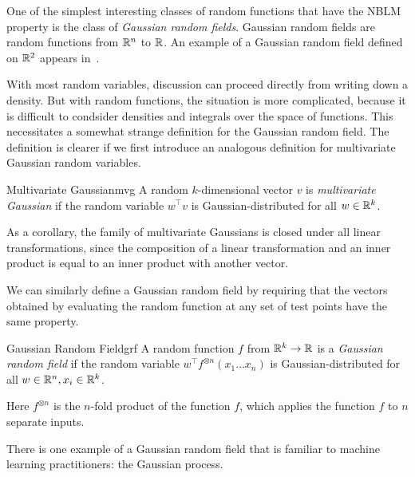 \documentclass[../../thesis.tex]{subfiles}
\begin{document}
One of the simplest interesting classes of random functions
that have the NBLM property is the class of
\emph{Gaussian random fields}.
Gaussian random fields are random functions
from $\mathbb{R}^n$ to $\mathbb{R}$.
An example of a Gaussian random field defined on $\mathbb{R}^2$
appears in~.

With most random variables,
discussion can proceed directly from writing down a density.
But with random functions,
the situation is more complicated,
because it is difficult to condsider densities and integrals over
the space of functions.
This necessitates a somewhat strange definition for the Gaussian random field.
The definition is clearer if we first introduce an analogous definition
for multivariate Gaussian random variables.

\begin{definition}{Multivariate Gaussian}{mvg}
	A random $k$-dimensional vector $v$ is \emph{multivariate Gaussian} if
	the random variable $w^\top v$ is Gaussian-distributed
	for all $w\in\mathbb{R}^k$.
\end{definition}
As a corollary,
the family of multivariate Gaussians is closed under all linear transformations,
since the composition of a linear transformation and an inner product
is equal to an inner product with another vector.

We can similarly define a Gaussian random field
by requiring that the vectors obtained by
evaluating the random function at any set of test points
have the same property.
\begin{definition}{Gaussian Random Field}{grf}
	A random function $f$ from $\mathbb{R}^k\to\mathbb{R}$ is a \emph{Gaussian random field}
	if the random variable $w^\top f^{\otimes n}(x_1 \dots x_n)$
	is Gaussian-distributed
	for all $w\in\mathbb{R}^n, x_i \in\mathbb{R}^k$.
\end{definition}
Here $f^{\otimes n}$ is the $n$-fold product of the function $f$,
which applies the function $f$ to $n$ separate inputs.

There is one example of a Gaussian random field
that is familiar to machine learning practitioners:
the Gaussian process.
\end{document}
